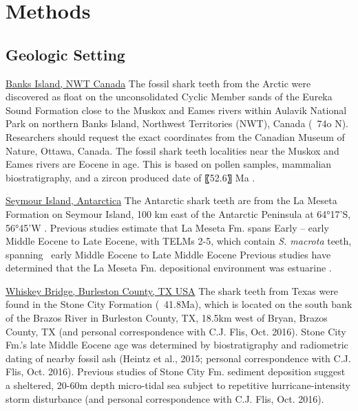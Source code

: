 \documentclass[]{rsos}%
\begin{document}
\section{Methods}

\subsection{Geologic Setting}
\underline{Banks Island, NWT Canada}
The fossil shark teeth from the Arctic were discovered as float on the unconsolidated Cyclic Member sands of the Eureka Sound Formation close to the Muskox and Eames rivers within Aulavik National Park on northern Banks Island, Northwest Territories (NWT), Canada (~74o N). 
Researchers should request the exact coordinates from the Canadian Museum of Nature, Ottawa, Canada. 
The fossil shark teeth localities near the Muskox and Eames rivers are Eocene in age. This is based on pollen samples, mammalian biostratigraphy, and a zircon produced date of 〖52.6〗 Ma \cite{Miall1979, Sweet2012, Reinhardt2010, Hopkins1974, Hopkins1975}. 

\underline{Seymour Island, Antarctica}
The Antarctic shark teeth are from the La Meseta Formation on Seymour Island, 100 km east of the Antarctic Peninsula at 64°17’S, 56°45’W \cite{Sadler1988, Ivany2008, Kriwet2005, Kriwet2016, Engelbrecht2017, Engelbrecht2017b, Engelbrecht2017c, Engelbrecht2017d, Engelbrecht2019}. 
Previous studies estimate that La Meseta Fm. spans Early – early Middle Eocene to Late Eocene, with TELMs 2-5, which contain \emph{S. macrota} teeth, spanning ~early Middle Eocene to Late Middle Eocene \cite{Long1992, Stilwell1992, Reguero2012, Kriwet2016}    
Previous studies have determined that the La Meseta Fm. depositional environment was estuarine \cite{Marenssi1994, Ivany2008, Amenabar2020}.

\underline{Whiskey Bridge, Burleston County, TX USA}
The shark teeth from Texas were found in the Stone City Formation (~41.8Ma), which is located on the south bank of the Brazos River in Burleston County, TX, 18.5km west of Bryan, Brazos County, TX \cite{Breard1999, Westgate} (and personal correspondence with C.J. Flis, Oct. 2016). 
Stone City Fm.’s late Middle Eocene age was determined by biostratigraphy and radiometric dating of nearby fossil ash (Heintz et al., 2015; personal correspondence with C.J. Flis, Oct. 2016).
Previous studies of Stone City Fm. sediment deposition suggest a sheltered, 20-60m depth micro-tidal sea subject to repetitive hurricane-intensity storm disturbance \cite{Breard1999, harding2014mineralogy} (and personal correspondence with C.J. Flis, Oct. 2016).  
\end{document}
